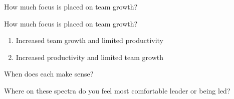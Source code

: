 \documentclass[aspectratio=169]{beamer}
\begin{document}
\begin{frame}
    How much focus is placed on team growth?
\end{frame}
\begin{frame}{How much focus is placed on team growth?}
    \begin{enumerate}
        \item Increased team growth and limited productivity
        \item Increased productivity and limited team growth
    \end{enumerate}
    When does each make sense?
\end{frame}
\begin{frame}
    Where on these spectra do you feel most comfortable leader or being led?
\end{frame}
\end{document}
